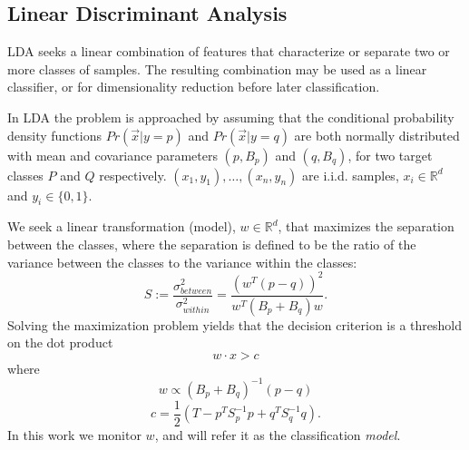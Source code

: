 \subsection{Linear Discriminant Analysis}%
LDA seeks a linear combination of features that characterize or separate two or more classes of samples.
The resulting combination may be used as a linear classifier, or for dimensionality reduction before later classification.

In LDA the problem is approached by assuming that the conditional probability
density functions $Pr(\vec x|y=p)$ and $Pr(\vec x|y=q)$ are both normally distributed with
mean and covariance parameters $(p, B_p)$ and
$(q, B_q)$, for two target classes $P$ and $Q$ respectively.
${(x_1,y_1),\ldots,(x_n,y_n)}$ are i.i.d. samples, $x_i \in \mathbb{R}^d$
and $y_i \in \{0,1\}$.

We seek a linear transformation (model), $w \in \mathbb{R}^d $,
that maximizes the separation between the classes, where the separation is
defined to be the ratio of the variance between the classes to the variance
within the classes:
\begin{equation}
S := \frac{\sigma^2_{between}}{\sigma^2_{within}} = \frac{(w^T (p -
q))^2}{w^T(B_p+B_q)w}.
\end{equation}
Solving the maximization problem yields that the decision criterion is a threshold on the
dot product
\begin{equation*} \label{eq:decision}
w \cdot x > c
\end{equation*}
where
\begin{equation} \label{eq:w}
w \propto (B_p+B_q)^{-1}(p - q)
\end{equation}
\begin{equation} \label{eq:c}
c = \frac{1}{2}(T-{p}^T S_p^{-1} {p}+{q}^T S_q^{-1} {q}).
\end{equation}
In this work we monitor $w$, and will refer it as the classification \textit{model}.


